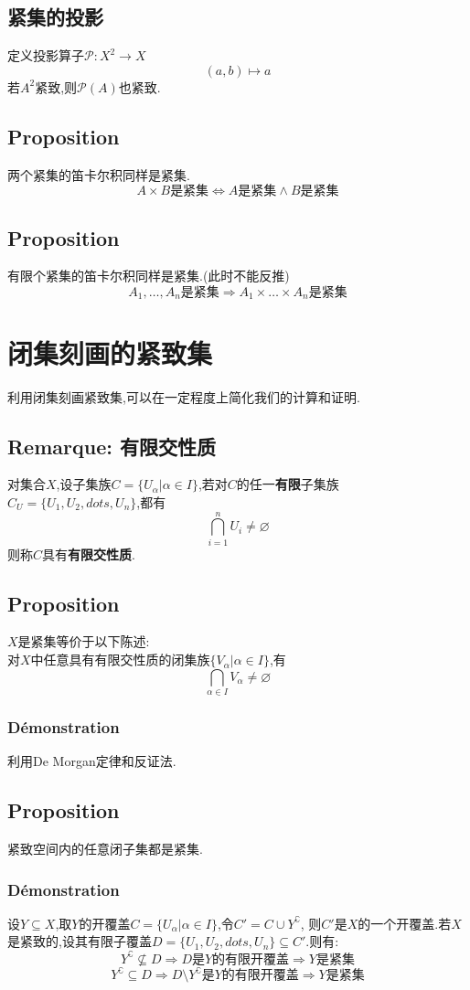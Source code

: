 \documentclass[12pt, a4paper, oneside]{ctexbook}
\begin{document}
  \subsection{紧集的投影}
  定义投影算子$\mathcal{P}:X^2\rightarrow X$
  $$
  (a,b)\mapsto a
  $$
  若$A^2$紧致,则$\mathcal{P}(A)$也紧致.
  \subsection{Proposition}
  两个紧集的笛卡尔积同样是紧集.
  $$
  A\times B\text{是紧集}\Leftrightarrow A\text{是紧集}\land B\text{是紧集}
  $$
  \subsection{Proposition}
  有限个紧集的笛卡尔积同样是紧集.(此时不能反推)
  $$
  A_1,\dots,A_n\text{是紧集}\Rightarrow A_1\times \dots\times A_n\text{是紧集}
  $$
  \section{闭集刻画的紧致集}
  利用闭集刻画紧致集,可以在一定程度上简化我们的计算和证明.
  \subsection{Remarque: 有限交性质}
  对集合$X$,设子集族$C=\{U_\alpha|\alpha\in I \}$,若对$C$的任一\textbf{有限}子集族$C_U=\{U_1,U_2,dots,U_n\}$,都有
  $$
  \bigcap_{i=1}^n U_i\neq \varnothing
  $$
  则称$C$具有\textbf{有限交性质}.
  \subsection{Proposition}
  \noindent
  $X$是紧集等价于以下陈述:\\
  对$X$中任意具有有限交性质的闭集族$\{V_\alpha|\alpha\in I\}$,有
  $$
    \bigcap_{\alpha\in I}V_\alpha\neq\varnothing
  $$
  \subsubsection{Démonstration}
  利用De Morgan定律和反证法.
   
  \subsection{Proposition}
  紧致空间内的任意闭子集都是紧集.
  \subsubsection{Démonstration}
  设$Y\subseteq X$,取$Y$的开覆盖$C=\{U_\alpha|\alpha\in I \}$,令$C'=C\cup Y^\complement$,
  则$C'$是$X$的一个开覆盖.若$X$是紧致的,设其有限子覆盖$D=\{U_1,U_2,dots,U_n\}\subseteq C'$.则有:
  $$
  Y^\complement\nsubseteq D\Rightarrow D\text{是}Y\text{的有限开覆盖}\Rightarrow Y\text{是紧集}
  $$
  $$
  Y^\complement\subseteq D\Rightarrow D\setminus Y^\complement \text{是}Y\text{的有限开覆盖}\Rightarrow Y\text{是紧集}
  $$
\end{document}
